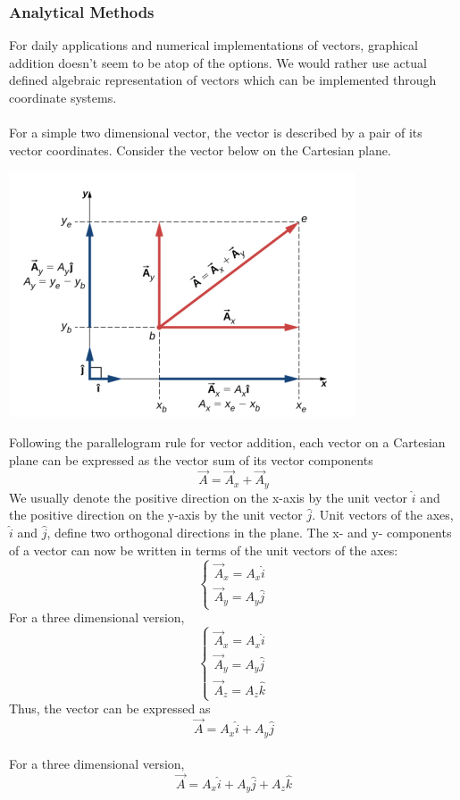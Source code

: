 \documentclass[12pt,addpoints]{exam}
\begin{document}
	\subsubsection*{Analytical Methods}
	For daily applications and numerical implementations of vectors, graphical addition doesn't seem to be atop of the options. We would rather use actual defined algebraic representation of vectors which can be implemented through coordinate systems. \\ \\
	For a simple two dimensional vector, the vector is described by a pair of its vector coordinates. Consider the vector below on the Cartesian plane.
	\begin{center}
		\includegraphics[scale=0.6]{2d.png}
	\end{center}
	Following the parallelogram rule for vector addition, each vector on a Cartesian plane can be expressed as the vector sum of its vector components
	$$\vec{A} = \vec{A}_{x} + \vec{A}_{y}$$
	We usually denote the positive direction on the x-axis by the unit vector $\hat{i}$ and the positive direction on the y-axis by the unit vector $\hat{j}$. Unit vectors of the axes, $\hat{i}$ and $\hat{j}$, define two orthogonal directions in the plane. The x- and y- components of a vector can now be written in terms of the unit vectors of the axes:
	$$\begin{cases} \vec{A}_{x} = A_{x} \hat{i} \\ \vec{A}_{y} = A_{y} \hat{j} \end{cases}$$
	For a three dimensional version,
	$$\begin{cases} \vec{A}_{x} = A_{x} \hat{i} \\ \vec{A}_{y} = A_{y} \hat{j} \\ \vec{A}_{z} = A_{z} \hat{k} \end{cases}$$
	Thus, the vector can be expressed as
	$$\vec{A} = A_{x} \hat{i} + A_{y} \hat{j}$$\\
	For a three dimensional version,
	$$\vec{A} = A_{x} \hat{i} + A_{y} \hat{j} + A_{z} \hat{k}$$\\
\end{document}
